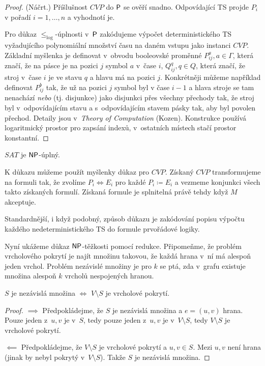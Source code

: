 \begin{proof} (Náčrt.)
    Příšlušnost $CVP$ do $\P$ se ověří snadno. Odpovídající TS projde
    $P_i$ v pořadí $i = 1,\ldots,n$ a vyhodnotí je.

    Pro důkaz $\leq_{\log}$-úplnosti v~$\P$ zakódujeme výpočet
    deterministického TS vyžadujícího polynomiální množství času na
    daném vstupu jako instanci $CVP$.
    Základní myšlenka je definovat v~obvodu booleovské proměnné
    $P^{a}_{ij}, a \in \Gamma$, která značí, že na pásce je na pozici
    $j$ symbol $a$ v~čase $i$,
    $Q^q_{ij}, q \in Q$, která značí, že stroj v~čase $i$ je ve stavu $q$
    a hlavu má na pozici $j$.
    Konkrétněji můžeme například definovat $P^{b}_{ij}$ tak,
    že už na pozici $j$ symbol byl v čase $i-1$ a hlava stroje se tam
    nenachází {\em nebo} (tj. disjunkce)
    jako disjunkci přes všechny přechody tak, že stroj byl
    v~odpovídajícím stavu a s~odpovídajícím stavem pásky tak, aby byl
    povolen přechod.
    Detaily jsou v~{\em Theory of Computation} (Kozen).
    Konstrukce používá logaritmický prostor pro zapsání indexů,
    v~ostatních místech stačí prostor konstantní.
\end{proof}

\begin{theorem}
    $SAT$ je $\NP$-úplný.
\end{theorem}

K důkazu můžeme použít myšlenky důkaz pro $CVP$.
Získaný $CVP$ transformujeme na formuli tak, že zvolíme
$P_i \Leftrightarrow E_i$ pro každé $P_i \coloneqq E_i$
a vezmeme konjunkci všech takto získaných formulí. Získaná formule je
splnitelná právě tehdy když $M$ akceptuje.

Standardnější, i když podobný, způsob důkazu je zakódování popisu
výpočtu každého nedeterministického TS do formule prvořádové logiky.


Nyní ukážeme důkaz $\NP$-těžkosti pomocí redukce. Připomeňme, že problém
vrcholového pokrytí je najít množinu takovou, že každá hrana v~ní má
alespoň jeden vrchol. Problém nezávislé množiny je pro $k$ se ptá, zda
v~grafu existuje množina alespoň $k$ vrcholů nespojených hranou.

\begin{theorem}
    $S$ je nezávislá množina $\iff$ $V \setminus S$ je vrcholové
    pokrytí.
\end{theorem}

\begin{proof}
$\implies$ Předpokládejme, že $S$ je nezávislá množina
a $e = (u,v)$ hrana. Pouze jeden z~$u,v$ je v~$S$,
tedy pouze jeden z~$u,v$ je v~$V \setminus S$, tedy $V \setminus S$ je
vrcholové pokrytí.

$\impliedby$ Předpokládejme, že $V \setminus S$ je vrcholové pokrytí
a $u, v \in S$. Mezi $u,v$ není hrana (jinak by nebyl pokrytý
v~$V \setminus S$). Takže $S$ je nezávislá množina.
\end{proof}

